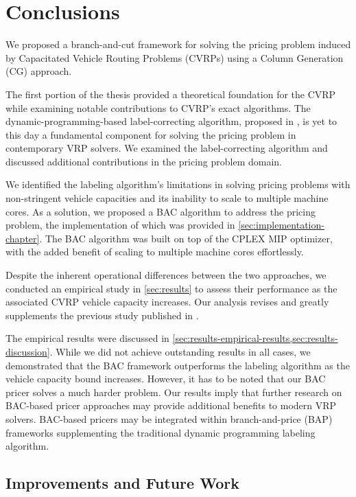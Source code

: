 \chapter{Conclusions}
\label{sec:conclusions}

We proposed a branch-and-cut framework for solving the pricing problem
induced by Capacitated Vehicle Routing Problems (CVRPs)
using a Column Generation (CG) approach.

The first portion of the thesis provided a theoretical foundation for the CVRP
while examining notable contributions to CVRP's exact algorithms.
The dynamic-programming-based label-correcting algorithm,
proposed in \textcite{desrochers1992, feillet2004},
is yet to this day a fundamental component for solving the pricing problem
in contemporary VRP solvers.
We examined the label-correcting algorithm
and discussed additional contributions in the pricing problem domain.

\medskip

We identified the labeling algorithm's limitations in solving pricing problems
with non-stringent vehicle capacities
and its inability to scale to multiple machine cores.
As a solution, we proposed a BAC algorithm to address the pricing problem,
the implementation of which was provided in \cref{sec:implementation-chapter}.
The BAC algorithm was built on top of the CPLEX MIP optimizer,
with the added benefit of scaling to multiple machine cores effortlessly.

Despite the inherent operational differences between the two approaches, we conducted an empirical study in \cref{sec:results}
to assess their performance as the associated CVRP vehicle capacity increases.
Our analysis revises and greatly supplements the previous study published in \textcite{jepsen2014}.

\medskip

The empirical results were discussed in \cref{sec:results-empirical-results,sec:results-discussion}.
While we did not achieve outstanding results in all cases,
we demonstrated that the BAC framework outperforms
the labeling algorithm as the vehicle capacity bound increases.
However, it has to be noted that our BAC pricer solves a much harder problem.
Our results imply that further research on BAC-based pricer approaches
may provide additional benefits to modern VRP solvers.
BAC-based pricers may be integrated within branch-and-price (BAP) frameworks
supplementing the traditional dynamic programming labeling algorithm.

\section{Improvements and Future Work}
\label{sec:conclusions-improvements-and-future-work}

